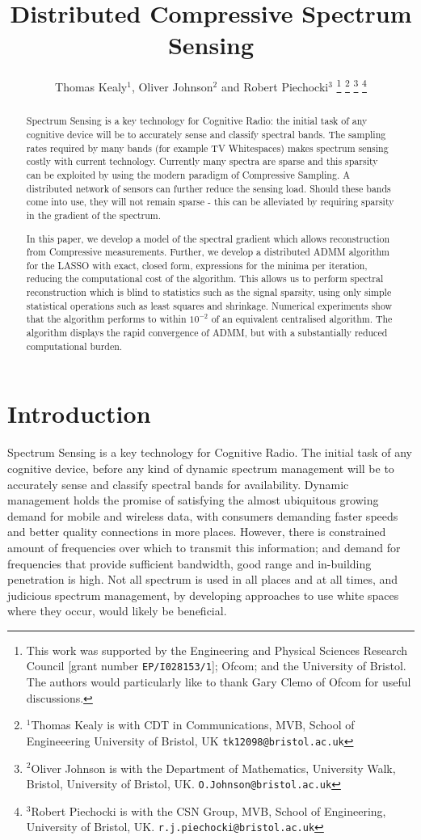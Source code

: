 \documentclass[conference]{IEEEtran}
\title{Distributed Compressive Spectrum Sensing}
\author{Thomas Kealy$^{1}$, Oliver Johnson$^{2}$ and Robert Piechocki$^{3}$%
\thanks{This work was supported by the Engineering and Physical Sciences Research Council [grant number {\tt EP/I028153/1}]; Ofcom; and the University of Bristol. The authors would particularly like to thank Gary Clemo of Ofcom for useful discussions.}%
\thanks{ $^{1}$Thomas Kealy is with CDT in Communications, MVB, School of Engineeering University of Bristol, UK
        {\tt\small tk12098@bristol.ac.uk}}%
\thanks{$^{2}$Oliver Johnson is with the Department of Mathematics, University Walk, Bristol, University of Bristol, UK.
        {\tt\small O.Johnson@bristol.ac.uk}}%
\thanks{$^{3}$Robert Piechocki is with the CSN Group, MVB, School of Engineering, University of Bristol, UK.
        {\tt\small r.j.piechocki@bristol.ac.uk}}%
}
\begin{document}
\maketitle

\begin{abstract}
\noindent Spectrum Sensing is a key technology for Cognitive Radio: the initial task of any cognitive device will be to accurately sense and classify spectral bands. The sampling rates required by many bands (for example TV Whitespaces) makes spectrum sensing costly with current technology. Currently many spectra are sparse and this sparsity can be exploited by using the modern paradigm of Compressive Sampling. A distributed network of sensors can further reduce the sensing load. Should these bands come into use, they will not remain sparse - this can be alleviated by requiring sparsity in the gradient of the spectrum. 

In this paper, we develop a model of the spectral gradient which allows reconstruction from Compressive measurements. Further, we develop a distributed ADMM algorithm for the LASSO with exact, closed form, expressions for the minima per iteration, reducing the computational cost of the algorithm. This allows us to perform spectral reconstruction which is blind to statistics such as the signal sparsity, using only simple statistical operations such as least squares and shrinkage. Numerical experiments show that the algorithm performs to within \(10^{-2}\) of an equivalent centralised algorithm. The algorithm displays the rapid convergence of ADMM, but with a substantially reduced computational burden.
\end{abstract}

\section{Introduction}

Spectrum Sensing is a key technology for Cognitive Radio. The initial task of any cognitive device, before any kind of dynamic spectrum management will be to accurately sense and classify spectral bands for availability. Dynamic management holds the promise of satisfying the almost ubiquitous growing demand for mobile and wireless data, with consumers demanding faster speeds and better quality connections in more places. However, there is constrained amount of frequencies over which to transmit this information; and demand for frequencies that provide sufficient bandwidth, good range and in-building penetration is high. Not all spectrum is used in all places and at all times, and judicious spectrum management, by developing approaches to use white spaces where they occur, would likely be beneficial.
\end{document}
